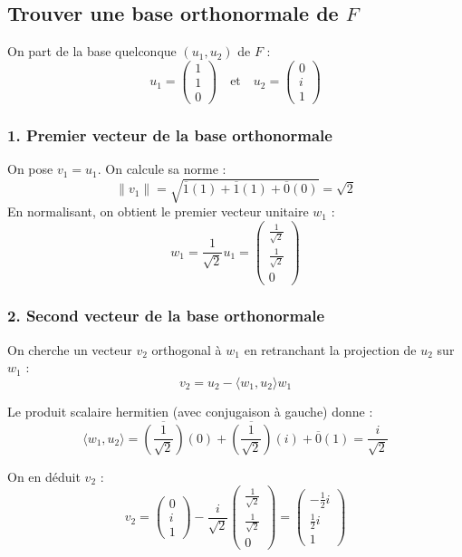 \documentclass[french]{yLectureNote}
\begin{document}
\subsection{Trouver une base orthonormale de $F$}

On part de la base quelconque $(u_1, u_2)$ de $F$ :
$$ u_1 = \begin{pmatrix} 1 \\ 1 \\ 0 \end{pmatrix} \quad \text{et} \quad u_2 = \begin{pmatrix} 0 \\ i \\ 1 \end{pmatrix} $$

\subsubsection*{1. Premier vecteur de la base orthonormale}
On pose $v_1 = u_1$. On calcule sa norme :
$$ \|v_1\| = \sqrt{\overline{1}(1) + \overline{1}(1) + \overline{0}(0)} = \sqrt{2} $$
En normalisant, on obtient le premier vecteur unitaire $w_1$ :
$$ w_1 = \frac{1}{\sqrt{2}} u_1 = \begin{pmatrix} \frac{1}{\sqrt{2}} \\ \frac{1}{\sqrt{2}} \\ 0 \end{pmatrix} $$

\subsubsection*{2. Second vecteur de la base orthonormale}
On cherche un vecteur $v_2$ orthogonal à $w_1$ en retranchant la projection de $u_2$ sur $w_1$ :
$$ v_2 = u_2 - \langle w_1, u_2 \rangle w_1 $$

Le produit scalaire hermitien (avec conjugaison à gauche) donne :
$$ \langle w_1, u_2 \rangle = \overline{\left(\frac{1}{\sqrt{2}}\right)}(0) + \overline{\left(\frac{1}{\sqrt{2}}\right)}(i) + \overline{0}(1) = \frac{i}{\sqrt{2}} $$

On en déduit $v_2$ :
$$ v_2 = \begin{pmatrix} 0 \\ i \\ 1 \end{pmatrix} - \frac{i}{\sqrt{2}} \begin{pmatrix} \frac{1}{\sqrt{2}} \\ \frac{1}{\sqrt{2}} \\ 0 \end{pmatrix} = \begin{pmatrix} -\frac{1}{2}i \\ \frac{1}{2}i \\ 1 \end{pmatrix} $$
\end{document}
